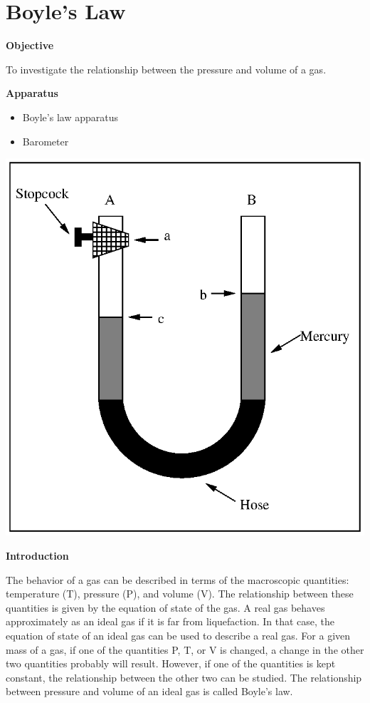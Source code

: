 
\section{Boyle's Law}

\makelabheader %

\textbf{Objective}

To investigate the relationship between the pressure and volume of
a gas.

\textbf{Apparatus}

\begin{itemize}
\item Boyle's law apparatus
\item Barometer
\end{itemize}
\vspace{0.3cm}
{\centering \includegraphics{boyles_law_fig_1.eps} \par}
\vspace{0.3cm}

\textbf{Introduction}

The behavior of a gas can be described in terms of the macroscopic
quantities: temperature (T), pressure (P), and volume (V). The relationship
between these quantities is given by the equation of state of the
gas. A real gas behaves approximately as an ideal gas if it is far
from liquefaction. In that case, the equation of state of an ideal
gas can be used to describe a real gas. For a given mass of a gas,
if one of the quantities P, T, or V is changed, a change in the other
two quantities probably will result. However, if one of the quantities
is kept constant, the relationship between the other two can be studied.
The relationship between pressure and volume of an ideal gas is called
Boyle's law.

